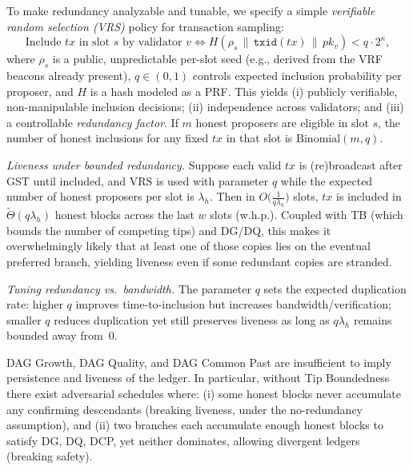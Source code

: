 \begin{itemize}
To make redundancy analyzable and tunable, we specify a simple \emph{verifiable random selection (VRS)}
policy for transaction sampling:
\[
\text{Include } tx \text{ in slot } s \text{ by validator } v \iff H(\rho_s \,\|\, \texttt{txid}(tx) \,\|\, pk_v) < q\cdot 2^\kappa ,
\]
where $\rho_s$ is a public, unpredictable per-slot seed (e.g., derived from the VRF beacons already present),
$q\in(0,1)$ controls expected inclusion probability per proposer, and $H$ is a hash modeled as a PRF.
This yields (i) publicly verifiable, non-manipulable inclusion decisions; (ii) independence across validators;
and (iii) a controllable \emph{redundancy factor}. If $m$ honest proposers are eligible in slot $s$, the number of
honest inclusions for any fixed $tx$ in that slot is $\mathrm{Binomial}(m,q)$.

\emph{Liveness under bounded redundancy.} Suppose each valid $tx$ is (re)broadcast after GST until included,
and VRS is used with parameter $q$ while the expected number of honest proposers per slot is $\lambda_h$.
Then in $O\!\big(\tfrac{1}{q\lambda_h}\big)$ slots, $tx$ is included in $\tilde\Theta(q\lambda_h)$ honest blocks across the last
$w$ slots (w.h.p.). Coupled with TB (which bounds the number of competing tips) and DG/DQ, this makes
it overwhelmingly likely that at least one of those copies lies on the eventual preferred branch, yielding
liveness even if some redundant copies are stranded.

\emph{Tuning redundancy vs.\ bandwidth.} The parameter $q$ sets the expected duplication rate:
higher $q$ improves time-to-inclusion but increases bandwidth/verification; smaller $q$ reduces duplication
yet still preserves liveness as long as $q\lambda_h$ remains bounded away from~$0$.

\end{itemize}




\begin{lemma}
DAG Growth, DAG Quality, and DAG Common Past are insufficient to imply persistence
and liveness of the ledger. In particular, without Tip Boundedness there exist
adversarial schedules where: (i) some honest blocks never accumulate any confirming
descendants (breaking liveness, under the no-redundancy assumption), and (ii) two
branches each accumulate enough honest blocks to satisfy DG, DQ, DCP, yet neither
dominates, allowing divergent ledgers (breaking safety).
\end{lemma}

